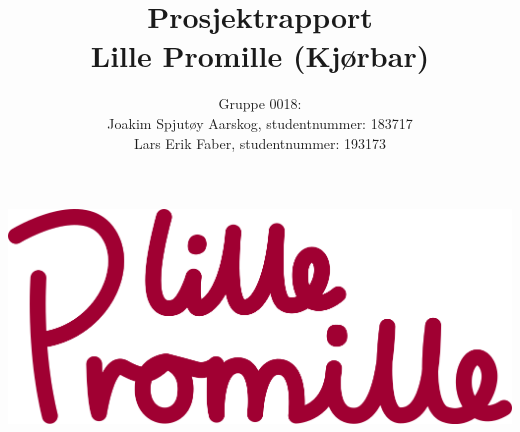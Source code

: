 \documentclass[12pt]{article}
\begin{document}
\title{%
    Prosjektrapport\\
    \large Lille Promille (Kjørbar)}
\author{
    Gruppe 0018:\\
    Joakim Spjutøy Aarskog, studentnummer: 183717\\
    Lars Erik Faber, studentnummer: 193173}
\date{}
\maketitle
\begin{center}
    \includegraphics[scale=2]{images/lille_promille_logo.png}
\end{center}
\thispagestyle{empty}
\newpage
{}
\tableofcontents
\thispagestyle{empty}
\newpage
\setcounter{page}{1}















\end{document}
